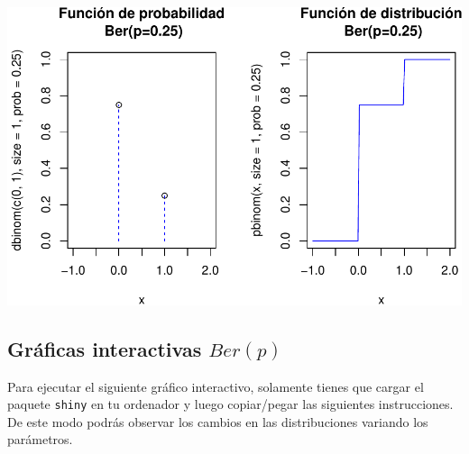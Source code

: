 \documentclass[]{book}
\begin{document}
\begin{center}\includegraphics{curso-probabilidad-udemy_files/figure-latex/unnamed-chunk-16-1} \end{center}

\hypertarget{gruxe1ficas-interactivas-berp}{%
\subsection{\texorpdfstring{Gráficas interactivas \(Ber(p)\)}{Gráficas interactivas Ber(p)}}\label{gruxe1ficas-interactivas-berp}}

Para ejecutar el siguiente gráfico interactivo, solamente tienes que cargar el paquete \texttt{shiny} en tu ordenador y luego copiar/pegar las siguientes instrucciones. De este modo podrás observar los cambios en las distribuciones variando los parámetros.
\end{document}
